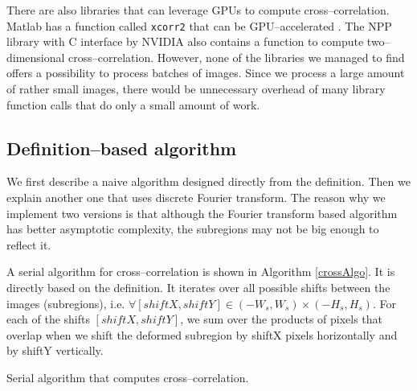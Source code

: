 There are also libraries that can leverage GPUs to compute cross--cor\-re\-la\-tion. Matlab has a function called \texttt{xcorr2} that can be GPU--accelerated \cite{MATLAB:2018}. The NPP library with C interface by NVIDIA \cite{NPP} also contains a function to compute two--dimensional cross--correlation. However, none of the libraries we managed to find offers a possibility to process batches of images. Since we process a large amount of rather small images, there would be unnecessary overhead of many library function calls that do only a small amount of work.

\subsection{Definition--based algorithm}
We first describe a naive algorithm designed directly from the definition. Then we explain another one that uses discrete Fourier transform. The reason why we implement two versions is that although the Fourier transform based algorithm has better asymptotic complexity, the subregions may not be big enough to reflect it.

A serial algorithm for cross--correlation is shown in Algorithm \ref{crossAlgo}. It is directly based on the definition. It iterates over all possible shifts between the images (subregions), i.e. $\forall [shiftX, shiftY] \in (-W_s, W_s) \times (-H_s, H_s)$. For each of the shifts $[shiftX, shiftY]$, we sum over the products of pixels that overlap when we shift the deformed subregion by shiftX pixels horizontally and by shiftY vertically.


\begin{algorithm}
	\caption{Serial algorithm that computes cross--correlation.}
	\label{crossAlgo}
	\vspace{5px}
	
\end{algorithm}

